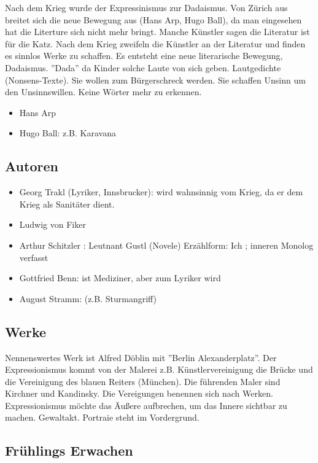 \documentclass[12pt,a4paper]{article}
\begin{document}
Nach dem Krieg wurde der Expressinismus zur Dadaismus. Von Zürich aus breitet sich die neue Bewegung aus (Hans Arp, Hugo Ball), da man eingesehen hat die Literture sich nicht mehr bringt. Manche Künstler sagen die Literatur ist für die Katz.
\newline
\newline
Nach dem Krieg zweifeln die Künstler an der Literatur und finden es sinnlos Werke zu schaffen. Es entsteht eine neue literarische Bewegung, Dadaismus. ''Dada'' da Kinder solche Laute von sich geben. Lautgedichte (Nonsens-Texte). Sie wollen zum Bürgerschreck werden. Sie schaffen Unsinn um den Unsinnswillen. Keine Wörter mehr zu erkennen. 

\begin{itemize}
\item Hans Arp
\item Hugo Ball: z.B. Karavana
\end{itemize}

\subsection{Autoren}

\begin{itemize}
\item Georg Trakl (Lyriker, Innsbrucker): wird wahnsinnig vom Krieg, da er dem Krieg als Sanitäter dient.
\item Ludwig von Fiker
\item Arthur Schitzler : Leutnant Gustl (Novele) Erzählform: Ich ; inneren Monolog verfasst
\item Gottfried Benn: ist Mediziner, aber zum Lyriker wird
\item August Stramm: (z.B. Sturmangriff) 
\end{itemize}

\subsection{Werke}

Nennenswertes Werk ist Alfred Döblin mit ''Berlin Alexanderplatz''.
Der Expressionismus kommt von der Malerei z.B. Künstlervereinigung die Brücke und die Vereinigung des blauen Reiters (München). Die führenden Maler sind Kirchner und Kandinsky. Die Vereigungen benennen sich nach Werken. Expressionismus möchte das Äußere aufbrechen, um das Innere sichtbar zu machen. Gewaltakt. Portraie steht im Vordergrund.

\subsection{Frühlings Erwachen}
\end{document}
